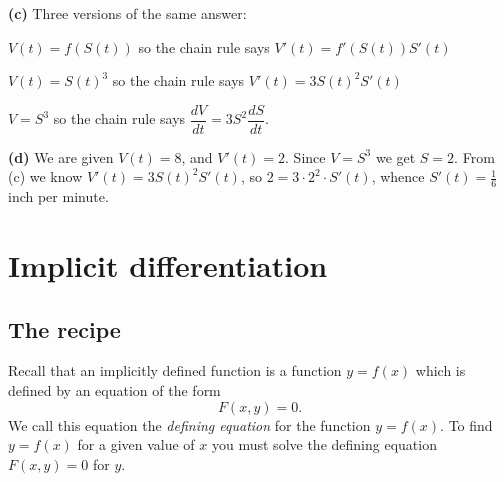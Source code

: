 \begin{multicols}{2}
\textbf{(c)} Three versions of the same answer:




$V(t) = f(S(t))$ so the chain rule says $V'(t) = f'(S(t)) S'(t)$




$V(t) = S(t)^3$ so the chain rule says $V'(t) = 3S(t)^2 S'(t)$




$V=S^3$ so the chain rule says $\dfrac{dV}{dt} =
3S^2\dfrac{dS}{dt}$.




\textbf{(d)} We are given $V(t) = 8$, and $V'(t)=2$.  Since $V=S^3$
we get $S=2$.  From (c) we know $V'(t)=3S(t)^2 S'(t)$, so $2 =
3\cdot 2^2\cdot S'(t)$, whence $S'(t) = \frac16$ inch per minute.
\endanswer
\end{multicols}
\noproblemfont




\section{Implicit differentiation} 
\label{sec:implicit-differentiation}
\subsection{The recipe} 
Recall that an implicitly defined function is a function $y=f(x)$
which is defined by an equation of the form
\[
F(x, y) = 0.
\]
We call this equation the \emph{defining equation} for the function
$y=f(x)$.  To find $y=f(x)$ for a given value of $x$ you must solve
the defining equation $F(x, y)=0$ for $y$.




